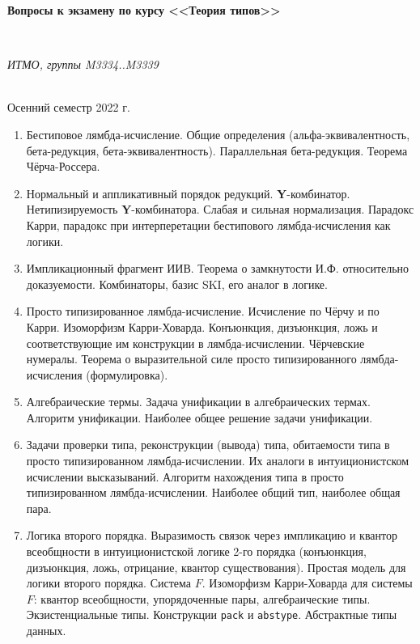 \documentclass[11pt,a4paper,oneside]{article}
\begin{document}
\begin{center}
\begin{Large}{\bfseries Вопросы к экзамену по курсу <<Теория типов>>}\end{Large}\\
\vspace{1mm}
\begin{small} \itshape ИТМО, группы M3334..M3339\end{small}\\
\small Осенний семестр 2022 г.
\end{center}

\begin{enumerate}
\item Бестиповое лямбда-исчисление. Общие определения (альфа-эквивалентность, бета-редукция, бета-эквивалентность).
Параллельная бета-редукция. Теорема Чёрча-Россера.
\item Нормальный и аппликативный порядок редукций. \textbf{Y}-комбинатор.
Нетипизируемость \textbf{Y}-комбинатора. Слабая и сильная нормализация.
Парадокс Карри, парадокс при интерперетации бестипового лямбда-исчисления как логики.
\item Импликационный фрагмент ИИВ. Теорема о замкнутости И.Ф. относительно доказуемости.
Комбинаторы, базис SKI, его аналог в логике.
\item Просто типизированное лямбда-исчисление. Исчисление по Чёрчу и по Карри. Изоморфизм Карри-Ховарда.
Конъюнкция, дизъюнкция, ложь и соответствующие им конструкции в лямбда-исчислении. 
Чёрчевские нумералы. Теорема о выразительной силе просто типизированного лямбда-исчисления (формулировка).
\item Алгебраические термы. Задача унификации в алгебраических термах. Алгоритм унификации. Наиболее общее решение задачи унификации.
\item Задачи проверки типа, реконструкции (вывода) типа, обитаемости типа в просто типизированном лямбда-исчислении.
Их аналоги в интуиционистском исчислении высказываний. 
Алгоритм нахождения типа в просто типизированном лямбда-исчислении. Наиболее общий тип, наиболее общая пара.
\item Логика второго порядка. Выразимость связок через импликацию и квантор всеобщности в интуиционистской логике 
2-го порядка (конъюнкция, дизъюнкция, ложь, отрицание, квантор существования). Простая модель для логики второго порядка.
Система $F$. Изоморфизм Карри-Ховарда для системы $F$: квантор всеобщности, упорядоченные пары, алгебраические типы.
Экзистенциальные типы. Конструкции \texttt{pack} и \texttt{abstype}. Абстрактные типы данных. 

\end{enumerate}
\end{document}
